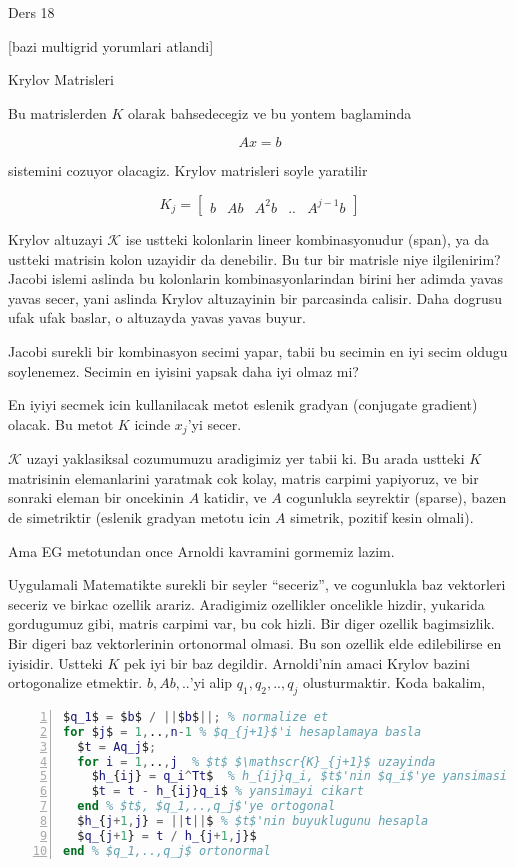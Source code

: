\documentclass[12pt,fleqn]{article}\usepackage{../common}
\begin{document}
Ders 18

[bazi multigrid yorumlari atlandi]

Krylov Matrisleri 

Bu matrislerden $K$ olarak bahsedecegiz ve bu yontem baglaminda 

\[ Ax = b \]

sistemini cozuyor olacagiz. Krylov matrisleri soyle yaratilir

\[ K_j = \left[\begin{array}{rrrrr}
b & Ab & A^2b & .. & A^{j-1}b
\end{array}\right] \]

Krylov altuzayi $\mathscr{K}$ ise ustteki kolonlarin lineer kombinasyonudur
(span), ya da ustteki matrisin kolon uzayidir da denebilir. Bu tur bir
matrisle niye ilgilenirim? Jacobi islemi aslinda bu kolonlarin
kombinasyonlarindan birini her adimda yavas yavas secer, yani aslinda
Krylov altuzayinin bir parcasinda calisir. Daha dogrusu ufak ufak baslar, o
altuzayda yavas yavas buyur.

Jacobi surekli bir kombinasyon secimi yapar, tabii bu secimin en iyi secim
oldugu soylenemez. Secimin en iyisini yapsak daha iyi olmaz mi? 

En iyiyi secmek icin kullanilacak metot eslenik gradyan (conjugate
gradient) olacak. Bu metot $K$ icinde $x_j$'yi secer. 

$\mathscr{K}$ uzayi yaklasiksal cozumumuzu aradigimiz yer tabii ki. Bu arada ustteki
$K$ matrisinin elemanlarini yaratmak cok kolay, matris carpimi yapiyoruz, ve
bir sonraki eleman bir oncekinin $A$ katidir, ve $A$ cogunlukla seyrektir
(sparse), bazen de simetriktir (eslenik gradyan metotu icin $A$ simetrik,
pozitif kesin olmali).

Ama EG metotundan once Arnoldi kavramini gormemiz lazim. 

Uygulamali Matematikte surekli bir seyler ``seceriz'', ve cogunlukla baz
vektorleri seceriz ve birkac ozellik arariz. Aradigimiz ozellikler
oncelikle hizdir, yukarida gordugumuz gibi, matris carpimi var, bu cok
hizli. Bir diger ozellik bagimsizlik. Bir digeri baz vektorlerinin
ortonormal olmasi. Bu son ozellik elde edilebilirse en iyisidir. Ustteki
$K$ pek iyi bir baz degildir. Arnoldi'nin amaci Krylov bazini ortogonalize
etmektir. $b,Ab,..$'yi alip $q_1,q_2,..,q_j$ olusturmaktir. Koda bakalim, 

\begin{lstlisting}[language=Matlab,mathescape,numbers=left]
$q_1$ = $b$ / ||$b$||; % normalize et
for $j$ = 1,..,n-1 % $q_{j+1}$'i hesaplamaya basla
  $t = Aq_j$; 
  for i = 1,..,j  % $t$ $\mathscr{K}_{j+1}$ uzayinda
    $h_{ij} = q_i^Tt$  % h_{ij}q_i, $t$'nin $q_i$'ye yansimasi
    $t = t - h_{ij}q_i$ % yansimayi cikart
  end % $t$, $q_1,..,q_j$'ye ortogonal
  $h_{j+1,j} = ||t||$ % $t$'nin buyuklugunu hesapla
  $q_{j+1} = t / h_{j+1,j}$ 
end % $q_1,..,q_j$ ortonormal
\end{lstlisting}
\end{document}

